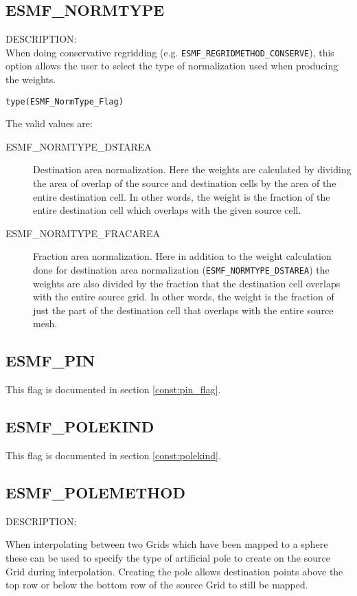 \subsection{ESMF\_NORMTYPE}

\label{opt:normType}

{\sf DESCRIPTION:\\}  When doing conservative regridding (e.g. {\tt ESMF\_REGRIDMETHOD\_CONSERVE}), this option allows the user to select the type of normalization used when producing the weights. 

{\tt type(ESMF\_NormType\_Flag)}

The valid values are:
 \begin{description}
\item [ESMF\_NORMTYPE\_DSTAREA]
 Destination area normalization. Here the weights are calculated by dividing the area of overlap of the source and 
 destination cells by the area of the entire destination cell. In other words, the weight is the fraction of the 
 entire destination cell which overlaps with the given source cell. 
\item [ESMF\_NORMTYPE\_FRACAREA]
   Fraction area normalization. Here in addition to the weight calculation done for destination area normalization 
({\tt ESMF\_NORMTYPE\_DSTAREA}) the weights are also divided by the fraction that the destination cell overlaps with
  the entire source grid. In other words, the weight is the fraction of just the part of the destination cell that 
  overlaps with the entire source mesh.  
\end{description}


\subsection{ESMF\_PIN}
This flag is documented in section \ref{const:pin_flag}.

\subsection{ESMF\_POLEKIND}
This flag is documented in section \ref{const:polekind}.

\subsection{ESMF\_POLEMETHOD}
\label{const:polemethod}

{\sf DESCRIPTION:\\}  
\begin{sloppypar}
When interpolating between two Grids which have been mapped to a sphere these can be used to specify the type of artificial pole to create on the source Grid during interpolation. Creating the pole allows destination points above the top row or below the bottom row of the source Grid to still be mapped.
\end{sloppypar}


